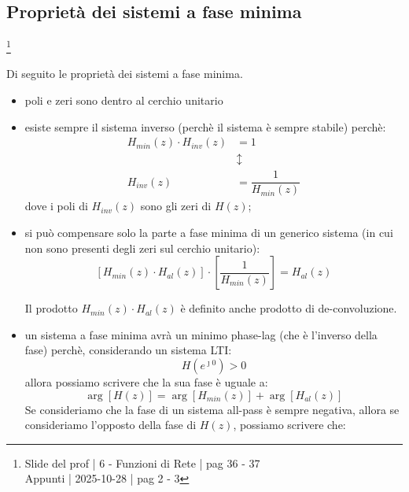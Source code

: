 \newpage 

\subsection{Proprietà dei sistemi a fase minima}

\footnote{ 
    Slide del prof | 6 - Funzioni di Rete | pag 36 - 37\\
    Appunti | 2025-10-28 | pag 2 - 3   
}

Di seguito le proprietà dei sistemi a fase minima. \newline 

\begin{itemize}
    \item poli e zeri sono dentro al cerchio unitario 
    \item esiste sempre il sistema inverso (perchè il sistema è sempre stabile) perchè: 
    {
        \Large 
        \begin{equation}
            \begin{split}
                H_{min} \left(z\right) \cdot H_{inv} \left(z\right) &= 1
                \\
                &\updownarrow
                \\
                H_{inv} \left(z\right) 
                &= 
                \dfrac{1}{H_{min} \left(z\right)} 
            \end{split}
        \end{equation}
    }
    dove i poli di $H_{inv} \left(z\right)$ sono gli zeri di $H \left(z\right)$; 
    \item si può compensare solo la parte a fase minima di un generico sistema (in cui non sono presenti degli zeri sul cerchio unitario): 
    {
        \Large 
        \begin{equation}
         \left[ H_{min} \left(z\right) \cdot H_{al} \left(z\right)\right]
         \cdot 
         \left[ \dfrac{1}{H_{min} \left(z\right)}\right] 
         = 
         H_{al} \left(z\right)  
        \end{equation}
    }
    \begin{tcolorbox}
        Il prodotto $H_{min} \left(z\right) \cdot H_{al} \left(z\right)$ è definito anche prodotto di de-convoluzione.
    \end{tcolorbox}
    \item un sistema a fase minima avrà un minimo phase-lag (che è l'inverso della fase) perchè, considerando un sistema LTI:
    {
        \Large 
        \begin{equation}
            H \left(e^{\jmath 0}\right) > 0
        \end{equation}
    } 
    allora possiamo scrivere che la sua fase è uguale a:  
    {
        \Large 
        \begin{equation}
            \arg \left[ H \left(z\right)\right] 
            = 
            \arg \left[ H_{min} \left(z\right)\right]
            + 
            \arg \left[ H_{al} \left(z\right)\right]
        \end{equation}
    } 
    Se consideriamo che la fase di un sistema all-pass è sempre negativa, allora se consideriamo l'opposto della fase di $H \left(z\right)$, 
    possiamo scrivere che: 
    

\end{itemize}
